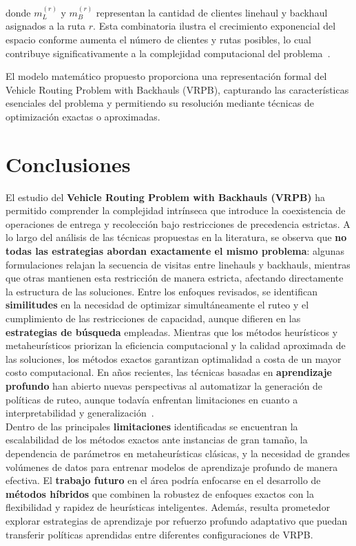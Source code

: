 \documentclass[letter, 10pt]{article}
\begin{document}
donde \( m_{L}^{(r)} \) y \( m_{B}^{(r)} \) representan la cantidad de clientes linehaul y backhaul asignados a la ruta \( r \). Esta combinatoria ilustra el crecimiento exponencial del espacio conforme aumenta el n\'umero de clientes y rutas posibles, lo cual contribuye significativamente a la complejidad computacional del problema~\cite{goetschalckx1989vehicle}.

El modelo matem\'atico propuesto proporciona una representaci\'on formal del Vehicle Routing Problem with Backhauls (VRPB), capturando las caracter\'isticas esenciales del problema y permitiendo su resoluci\'on mediante t\'ecnicas de optimizaci\'on exactas o aproximadas.


\section{Conclusiones}
El estudio del \textbf{Vehicle Routing Problem with Backhauls (VRPB)} ha permitido comprender la complejidad intr\'inseca que introduce la coexistencia de operaciones de entrega y recolecci\'on bajo restricciones de precedencia estrictas. A lo largo del an\'alisis de las t\'ecnicas propuestas en la literatura, se observa que \textbf{no todas las estrategias abordan exactamente el mismo problema}: algunas formulaciones relajan la secuencia de visitas entre linehauls y backhauls, mientras que otras mantienen esta restricci\'on de manera estricta, afectando directamente la estructura de las soluciones. Entre los enfoques revisados, se identifican \textbf{similitudes} en la necesidad de optimizar simult\'aneamente el ruteo y el cumplimiento de las restricciones de capacidad, aunque difieren en las \textbf{estrategias de b\'usqueda} empleadas. Mientras que los m\'etodos heur\'isticos y metaheur\'isticos priorizan la eficiencia computacional y la calidad aproximada de las soluciones, los m\'etodos exactos garantizan optimalidad a costa de un mayor costo computacional. En a\~nos recientes, las t\'ecnicas basadas en \textbf{aprendizaje profundo} han abierto nuevas perspectivas al automatizar la generaci\'on de pol\'iticas de ruteo, aunque todav\'ia enfrentan limitaciones en cuanto a interpretabilidad y generalizaci\'on~\cite{wang2025deep}. \\

Dentro de las principales \textbf{limitaciones} identificadas se encuentran la escalabilidad de los m\'etodos exactos ante instancias de gran tama\~no, la dependencia de par\'ametros en metaheur\'isticas cl\'asicas, y la necesidad de grandes vol\'umenes de datos para entrenar modelos de aprendizaje profundo de manera efectiva. El \textbf{trabajo futuro} en el \'area podr\'ia enfocarse en el desarrollo de \textbf{m\'etodos h\'ibridos} que combinen la robustez de enfoques exactos con la flexibilidad y rapidez de heur\'isticas inteligentes. Adem\'as, resulta prometedor explorar estrategias de aprendizaje por refuerzo profundo adaptativo que puedan transferir pol\'iticas aprendidas entre diferentes configuraciones de VRPB.\\
\end{document}
